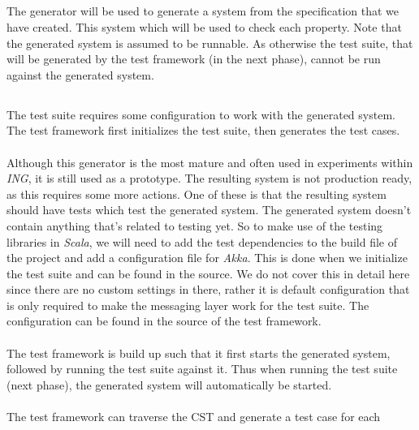\subsection{\tfPhaseThree{}}
The generator will be used to generate a system from the specification that we
have created. This system which will be used to check each property. Note that
the generated system is assumed to be runnable. As otherwise the test suite,
that will be generated by the test framework (in the next phase), cannot be run
against the generated system.

\subsection{\tfPhaseFour{}}
\label{sct:3_tf_phase_four}
The test suite requires some configuration to work with the generated system.
The test framework first initializes the test suite, then generates the test
cases.\\
\\
Although this generator is the most mature and often used in experiments within
\textit{ING}, it is still used as a prototype. The resulting system is not
production ready, as this requires some more actions. One of these is that the
resulting system should have tests which test the generated system. The
generated system doesn't contain anything that's related to testing yet. So to
make use of the testing libraries in \textit{Scala}, we will need to add the
test dependencies to the build file of the project and add a configuration file
for \textit{Akka}. This is done when we initialize the test suite and can be
found in the source. We do not cover this in detail here since there are no
custom settings in there, rather it is default configuration that is only
required to make the messaging layer work for the test suite. The configuration
can be found in the source of the test framework.\\
\\
The test framework is build up such that it first starts the generated system,
followed by running the test suite against it. Thus when running the test suite
(next phase), the generated system will automatically be started.\\
\\
The test framework can traverse the CST and generate a test case for each
